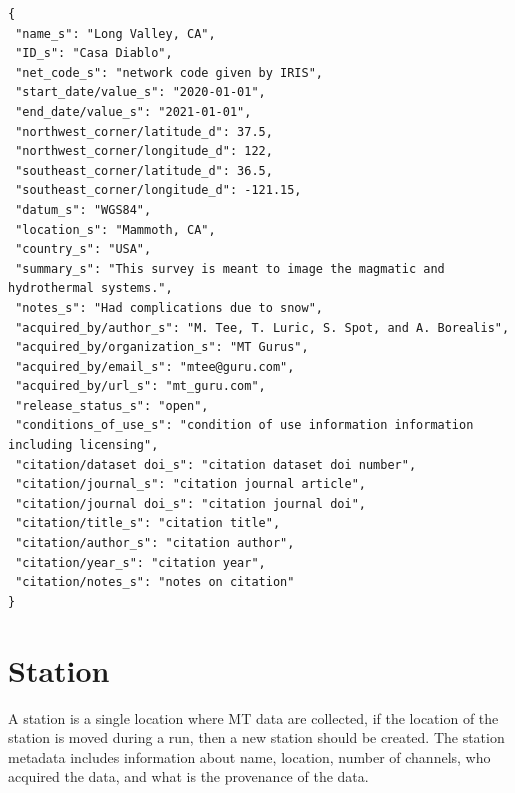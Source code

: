 \documentclass{article}
\begin{document}
\begin{verbatim}
{
 "name_s": "Long Valley, CA",
 "ID_s": "Casa Diablo",
 "net_code_s": "network code given by IRIS",
 "start_date/value_s": "2020-01-01",
 "end_date/value_s": "2021-01-01",
 "northwest_corner/latitude_d": 37.5,
 "northwest_corner/longitude_d": 122,
 "southeast_corner/latitude_d": 36.5,
 "southeast_corner/longitude_d": -121.15,
 "datum_s": "WGS84",
 "location_s": "Mammoth, CA",
 "country_s": "USA",
 "summary_s": "This survey is meant to image the magmatic and hydrothermal systems.",
 "notes_s": "Had complications due to snow",
 "acquired_by/author_s": "M. Tee, T. Luric, S. Spot, and A. Borealis",
 "acquired_by/organization_s": "MT Gurus",
 "acquired_by/email_s": "mtee@guru.com",
 "acquired_by/url_s": "mt_guru.com",
 "release_status_s": "open",
 "conditions_of_use_s": "condition of use information information including licensing",
 "citation/dataset doi_s": "citation dataset doi number",
 "citation/journal_s": "citation journal article",
 "citation/journal doi_s": "citation journal doi",
 "citation/title_s": "citation title",
 "citation/author_s": "citation author",
 "citation/year_s": "citation year",
 "citation/notes_s": "notes on citation"
}
\end{verbatim}

\newpage
\section{Station}

A station is a single location where MT data are collected, if the location of the station is moved during a run, then a new station should be created.  The station metadata includes information about name, location, number of channels, who acquired the data, and what is the provenance of the data.
\end{document}
